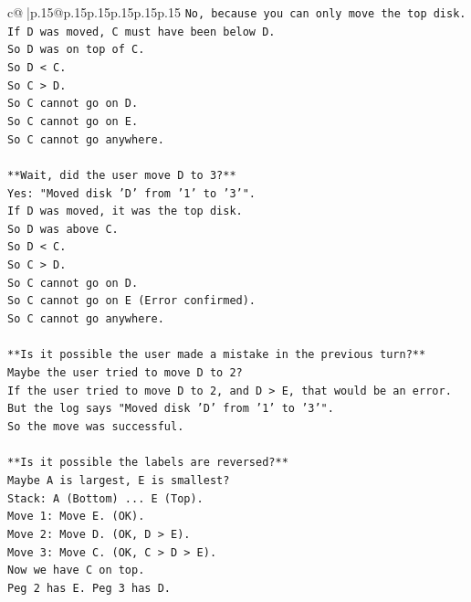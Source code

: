 \documentclass{article}
\begin{document}
{\begin{supertabular}{c@{$\;$}|p{.15\linewidth}@{}p{.15\linewidth}p{.15\linewidth}p{.15\linewidth}p{.15\linewidth}p{.15\linewidth}}
{{{\texttt{No, because you can only move the top disk.} \\
\texttt{If D was moved, C must have been below D.} \\
\texttt{So D was on top of C.} \\
\texttt{So D < C.} \\
\texttt{So C > D.} \\
\texttt{So C cannot go on D.} \\
\texttt{So C cannot go on E.} \\
\texttt{So C cannot go anywhere.} \\
\\ 
\texttt{**Wait, did the user move D to 3?**} \\
\texttt{Yes: "Moved disk 'D' from '1' to '3'".} \\
\texttt{If D was moved, it was the top disk.} \\
\texttt{So D was above C.} \\
\texttt{So D < C.} \\
\texttt{So C > D.} \\
\texttt{So C cannot go on D.} \\
\texttt{So C cannot go on E (Error confirmed).} \\
\texttt{So C cannot go anywhere.} \\
\\ 
\texttt{**Is it possible the user made a mistake in the previous turn?**} \\
\texttt{Maybe the user tried to move D to 2?} \\
\texttt{If the user tried to move D to 2, and D > E, that would be an error.} \\
\texttt{But the log says "Moved disk 'D' from '1' to '3'".} \\
\texttt{So the move was successful.} \\
\\ 
\texttt{**Is it possible the labels are reversed?**} \\
\texttt{Maybe A is largest, E is smallest?} \\
\texttt{Stack: A (Bottom) ... E (Top).} \\
\texttt{Move 1: Move E. (OK).} \\
\texttt{Move 2: Move D. (OK, D > E).} \\
\texttt{Move 3: Move C. (OK, C > D > E).} \\
\texttt{Now we have C on top.} \\
\texttt{Peg 2 has E. Peg 3 has D.} \\
}}}
\end{supertabular}}
\end{document}
